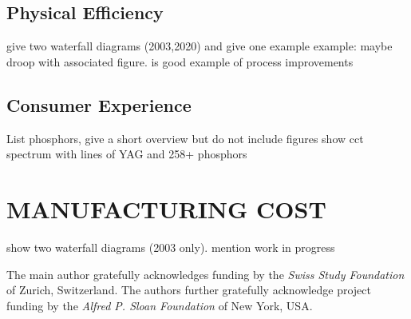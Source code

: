 \documentclass[a4paper,nocompress]{spie}  %
\begin{document}
\subsection{Physical Efficiency}

give two waterfall diagrams (2003,2020) and give one example
example: maybe droop with associated figure. is good example of process improvements

\subsection{Consumer Experience}

List phosphors, give a short overview but do not include figures
show cct spectrum with lines of YAG and 258+ phosphors

\section{MANUFACTURING COST}

show two waterfall diagrams (2003 only). mention work in progress



\clearpage
\acknowledgments %
 
The main author gratefully acknowledges funding by the \textit{Swiss Study Foundation} of Zurich, Switzerland. The authors further gratefully acknowledge project funding by the \textit{Alfred P. Sloan Foundation} of New York, USA.

\end{document}
